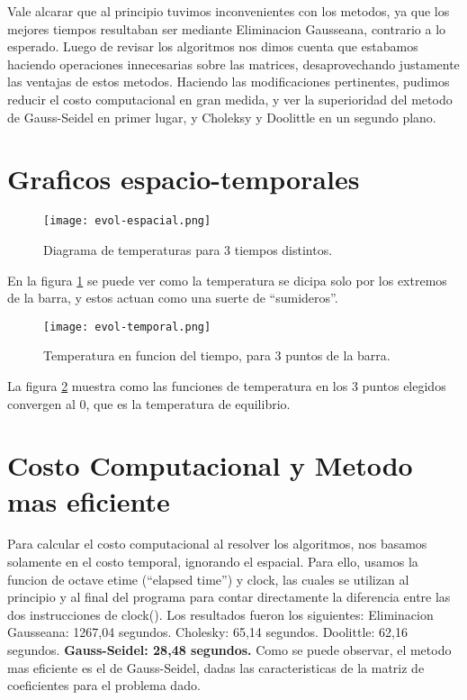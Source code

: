 \documentclass{article}
\begin{document}
Vale alcarar que al principio tuvimos inconvenientes con los metodos,
ya que los mejores tiempos resultaban ser mediante Eliminacion
Gausseana, contrario a lo esperado.
Luego de revisar los algoritmos nos dimos cuenta que estabamos
haciendo operaciones innecesarias sobre las matrices, desaprovechando
justamente las ventajas de estos metodos. Haciendo las modificaciones
pertinentes, pudimos reducir el costo computacional en gran medida, y
ver la superioridad del metodo de Gauss-Seidel en primer lugar, y
Choleksy y Doolittle en un segundo plano.

\section{Graficos espacio-temporales}

\begin{figure}[H]
  \texttt{[image: evol-espacial.png]}
  \centering
  \caption{Diagrama de temperaturas para 3 tiempos distintos.}
  \label{fig:espacial}
\end{figure}

En la figura \ref{fig:espacial} se puede ver como la temperatura se
dicipa solo por los extremos de la barra, y estos actuan como una
suerte de ``sumideros''.

\begin{figure}[H]
  \texttt{[image: evol-temporal.png]}
  \centering
  \caption{Temperatura en funcion del tiempo, para 3 puntos de la barra.}
  \label{fig:temporal}
\end{figure}
La figura \ref{fig:temporal} muestra como las funciones de temperatura
en los 3 puntos elegidos convergen al 0, que es la temperatura de equilibrio.

\section{Costo Computacional y Metodo mas eficiente}
Para calcular el costo computacional al resolver los algoritmos, nos
basamos solamente en el costo temporal, ignorando el espacial. Para
ello, usamos la funcion de octave etime (``elapsed time'') y clock,
las cuales se utilizan al principio y al final del programa para
contar directamente la diferencia entre las dos instrucciones de
clock().
Los resultados fueron los siguientes: 
Eliminacion Gausseana: 1267,04 segundos.
Cholesky: 65,14 segundos.
Doolittle: 62,16 segundos.
\textbf{Gauss-Seidel: 28,48 segundos.}
\newline
Como se puede observar, el metodo mas eficiente es el de Gauss-Seidel,
dadas las caracteristicas de la matriz de coeficientes para el
problema dado.
\end{document}
